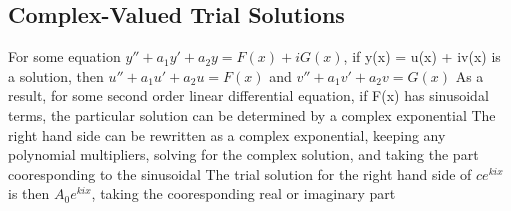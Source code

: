 \documentclass[11 pt, twoside]{article}
\newenvironment{outline*}
{
	\begin{outline}[enumerate]
	}
	{\end{outline}
}
\begin{document}
\subsection{Complex-Valued Trial Solutions}
\begin{outline*}
\1 For some equation $y'' + a_1y' + a_2y = F(x) + iG(x)$, if y(x) = u(x) + iv(x) is a solution, then $u'' + a_1u' + a_2u = F(x)$ and $v'' + a_1v' + a_2v = G(x)$
\1 As a result, for some second order linear differential equation, if F(x) has sinusoidal terms, the particular solution can be determined by a complex exponential
\2 The right hand side can be rewritten as a complex exponential, keeping any polynomial multipliers, solving for the complex solution, and taking the part cooresponding to the sinusoidal
\2 The trial solution for the right hand side of $ce^{kix}$ is then $A_0e^{kix}$, taking the cooresponding real or imaginary part
\end{outline*}
\end{document}
